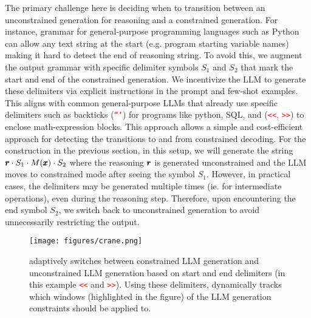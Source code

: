 The primary challenge here is deciding when to transition between an unconstrained generation for reasoning and a constrained generation. 
For instance, grammar for general-purpose programming languages such as Python can allow any text string at the start (e.g. program starting variable names) making it hard to detect the end of reasoning string. 
To avoid this, we augment the output grammar with specific delimiter symbols $S_1$ and $S_2$ that mark the start and end of the constrained generation. 
We incentivize the LLM to generate these delimiters via explicit instructions in the prompt and few-shot examples. This aligns with common general-purpose LLMs that already use specific delimiters such as backticks (\textcolor{red}{\texttt{```}}) for programs like python, SQL, and (\textcolor{red}{\texttt{<<}, \texttt{>>}}) to enclose math-expression blocks. This approach allows a simple and cost-efficient approach for detecting the transitions to and from constrained decoding. For the construction in the previous section, in this setup, we will generate the string $\pmb{r}\cdot S_1\cdot M(\pmb{x})\cdot S_2$ where the reasoning $\pmb{r}$ is generated unconstrained and the LLM moves to constrained mode after seeing the symbol $S_1$. However, in practical cases, the delimiters may be generated multiple times (ie. for intermediate operations), even during the reasoning step. Therefore, upon encountering the end symbol $S_2$, we switch back to unconstrained generation to avoid unnecessarily restricting the output.


\begin{figure}[tbh]
\centering
\texttt{[image: figures/crane.png]}
\vspace{-.1in}
\caption{
\Tool{} adaptively switches between constrained LLM generation and unconstrained LLM generation based on start and end delimiters (in this example \textcolor{red}{\texttt{<<}} and  \textcolor{red}{\texttt{>>}}). Using these delimiters, \Tool{} dynamically tracks which windows (highlighted in the figure) of the LLM generation constraints should be applied to. 
} 
\label{fig:crane}
\vspace{-.1in}
\end{figure}

